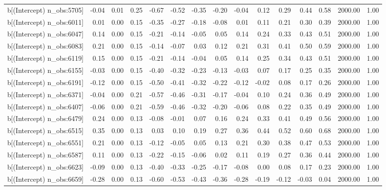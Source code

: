 \begin{table}[ht]
\begin{tabular}{rrrrrrrrrrrrrrr}
  b[(Intercept) n\_obs:5705] & -0.04 & 0.01 & 0.25 & -0.67 & -0.52 & -0.35 & -0.20 & -0.04 & 0.12 & 0.29 & 0.44 & 0.58 & 2000.00 & 1.00 \\ 
  b[(Intercept) n\_obs:6011] & 0.01 & 0.00 & 0.15 & -0.35 & -0.27 & -0.18 & -0.08 & 0.01 & 0.11 & 0.21 & 0.30 & 0.39 & 2000.00 & 1.00 \\ 
  b[(Intercept) n\_obs:6047] & 0.14 & 0.00 & 0.15 & -0.21 & -0.14 & -0.05 & 0.05 & 0.14 & 0.24 & 0.33 & 0.43 & 0.51 & 2000.00 & 1.00 \\ 
  b[(Intercept) n\_obs:6083] & 0.21 & 0.00 & 0.15 & -0.14 & -0.07 & 0.03 & 0.12 & 0.21 & 0.31 & 0.41 & 0.50 & 0.59 & 2000.00 & 1.00 \\ 
  b[(Intercept) n\_obs:6119] & 0.15 & 0.00 & 0.15 & -0.21 & -0.14 & -0.04 & 0.05 & 0.14 & 0.25 & 0.34 & 0.43 & 0.51 & 2000.00 & 1.00 \\ 
  b[(Intercept) n\_obs:6155] & -0.03 & 0.00 & 0.15 & -0.40 & -0.32 & -0.23 & -0.13 & -0.03 & 0.07 & 0.17 & 0.25 & 0.35 & 2000.00 & 1.00 \\ 
  b[(Intercept) n\_obs:6191] & -0.12 & 0.00 & 0.15 & -0.50 & -0.41 & -0.32 & -0.22 & -0.12 & -0.02 & 0.08 & 0.17 & 0.26 & 2000.00 & 1.00 \\ 
  b[(Intercept) n\_obs:6371] & -0.04 & 0.00 & 0.21 & -0.57 & -0.46 & -0.31 & -0.17 & -0.04 & 0.10 & 0.24 & 0.36 & 0.49 & 2000.00 & 1.00 \\ 
  b[(Intercept) n\_obs:6407] & -0.06 & 0.00 & 0.21 & -0.59 & -0.46 & -0.32 & -0.20 & -0.06 & 0.08 & 0.22 & 0.35 & 0.49 & 2000.00 & 1.00 \\ 
  b[(Intercept) n\_obs:6479] & 0.24 & 0.00 & 0.13 & -0.08 & -0.01 & 0.07 & 0.16 & 0.24 & 0.33 & 0.41 & 0.49 & 0.56 & 2000.00 & 1.00 \\ 
  b[(Intercept) n\_obs:6515] & 0.35 & 0.00 & 0.13 & 0.03 & 0.10 & 0.19 & 0.27 & 0.36 & 0.44 & 0.52 & 0.60 & 0.68 & 2000.00 & 1.00 \\ 
  b[(Intercept) n\_obs:6551] & 0.21 & 0.00 & 0.13 & -0.12 & -0.05 & 0.05 & 0.13 & 0.21 & 0.30 & 0.38 & 0.47 & 0.53 & 2000.00 & 1.00 \\ 
  b[(Intercept) n\_obs:6587] & 0.11 & 0.00 & 0.13 & -0.22 & -0.15 & -0.06 & 0.02 & 0.11 & 0.19 & 0.27 & 0.36 & 0.44 & 2000.00 & 1.00 \\ 
  b[(Intercept) n\_obs:6623] & -0.09 & 0.00 & 0.13 & -0.40 & -0.33 & -0.25 & -0.17 & -0.08 & 0.00 & 0.08 & 0.17 & 0.23 & 2000.00 & 1.00 \\ 
  b[(Intercept) n\_obs:6659] & -0.28 & 0.00 & 0.13 & -0.60 & -0.53 & -0.43 & -0.36 & -0.28 & -0.19 & -0.12 & -0.03 & 0.04 & 2000.00 & 1.00 \\ 

\end{tabular}
\end{table}
